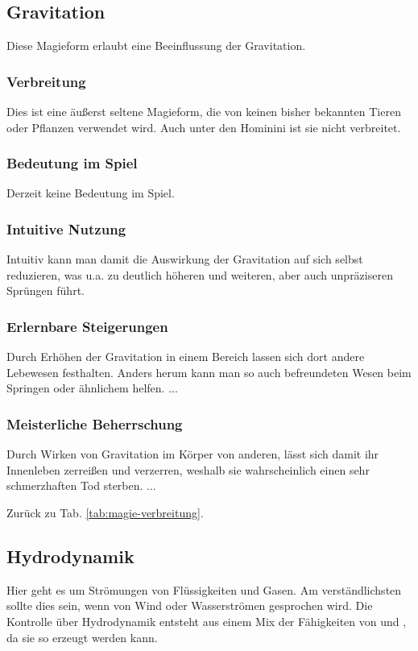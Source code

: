 \subsection{Gravitation}\label{magie:gravitation}
Diese Magieform erlaubt eine Beeinflussung der Gravitation.

\subsubsection{Verbreitung}
Dies ist eine äußerst seltene Magieform, die von keinen bisher bekannten Tieren oder Pflanzen verwendet wird.
Auch unter den Hominini ist sie nicht verbreitet.

\subsubsection{Bedeutung im Spiel}
Derzeit keine Bedeutung im Spiel.

\subsubsection{Intuitive Nutzung}
Intuitiv kann man damit die Auswirkung der Gravitation auf sich selbst reduzieren, was u.a. zu deutlich höheren und weiteren, aber auch unpräziseren Sprüngen führt.

\subsubsection{Erlernbare Steigerungen}
\begin{outline}
	\1 Durch Erhöhen der Gravitation in einem Bereich lassen sich dort andere Lebewesen festhalten.
	\1 Anders herum kann man so auch befreundeten Wesen beim Springen oder ähnlichem helfen.
	\1 ...
\end{outline}

\subsubsection{Meisterliche Beherrschung} 
\begin{outline}
	\1 Durch Wirken von Gravitation im Körper von anderen, lässt sich damit ihr Innenleben zerreißen und verzerren, weshalb sie wahrscheinlich einen sehr schmerzhaften Tod sterben.
	\1 ...
\end{outline}
Zurück zu Tab. \ref{tab:magie-verbreitung}.



\subsection{Hydrodynamik}\label{magie:hydrodynamik}
Hier geht es  um Strömungen von Flüssigkeiten und Gasen.
Am verständlichsten sollte dies sein, wenn von Wind oder Wasserströmen gesprochen wird.
Die Kontrolle über Hydrodynamik entsteht aus einem Mix der Fähigkeiten von  und , da sie so erzeugt werden kann.

